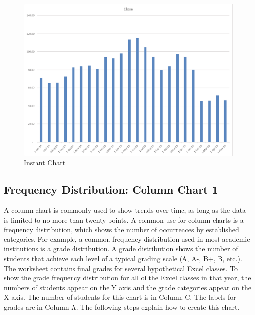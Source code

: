 \begin{figure}[H]
	\centering
	\includegraphics[width=\maxwidth{.95\linewidth}]{gfx/ch04_fig12}
	\caption{Instant Chart}
	\label{04:fig12}
\end{figure}

\subsection{Frequency Distribution: Column Chart 1}

A column chart is commonly used to show trends over time, as long as the data is limited to no more than twenty points. A common use for column charts is a frequency distribution, which shows the number of occurrences by established categories. For example, a common frequency distribution used in most academic institutions is a grade distribution. A grade distribution shows the number of students that achieve each level of a typical grading scale (A, A-, B+, B, etc.). The  worksheet contains final grades for several hypothetical Excel classes. To show the grade frequency distribution for all of the Excel classes in that year, the numbers of students appear on the Y axis and the grade categories appear on the X axis. The number of students for this chart is in Column C. The labels for grades are in Column A. The following steps explain how to create this chart.

